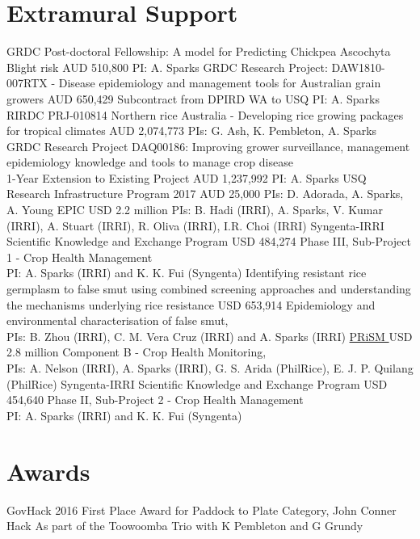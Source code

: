\section*{Extramural Support}
  \begin{entrylist}
			{GRDC Post-doctoral Fellowship: A model for Predicting Chickpea Ascochyta Blight risk}
			{AUD 510,800}
			{PI: A. Sparks}
			{GRDC Research Project: DAW1810-007RTX - Disease epidemiology and management tools for Australian grain growers}
			{AUD 650,429}
			{Subcontract from DPIRD WA to USQ PI: A. Sparks}
			{RIRDC PRJ-010814 Northern rice Australia - Developing rice growing packages for tropical climates}
			{AUD 2,074,773}
			{PIs: G. Ash, K. Pembleton, A. Sparks}
			{GRDC Research Project DAQ00186: Improving grower surveillance, management epidemiology knowledge and tools to manage crop disease\\1-Year Extension to Existing Project}
			{AUD 1,237,992}
			{PI: A. Sparks}
      {USQ Research Infrastructure Program 2017}
      {AUD 25,000}
      {PIs: D. Adorada, A. Sparks, A. Young}
      {EPIC }
      {USD 2.2 million}
      {PIs: B. Hadi (IRRI), A. Sparks, V. Kumar (IRRI), A. Stuart (IRRI), R. Oliva (IRRI), I.R. Choi (IRRI)}
	    {Syngenta-IRRI Scientific Knowledge and Exchange Program}
	    {USD 484,274}
	    {Phase III, Sub-Project 1 - Crop Health Management\\PI: A. Sparks (IRRI) and K. K. Fui (Syngenta)}
      {Identifying resistant rice germplasm to false smut using combined screening approaches and understanding the mechanisms underlying rice resistance}
      {USD 653,914}
      {Epidemiology and environmental characterisation of false smut,\\PIs: B. Zhou (IRRI), C. M. {Vera Cruz} (IRRI) and A. Sparks (IRRI)}
	    {\href{http://philippinericeinfo.ph/}{PRiSM }}
	    {USD 2.8 million}
	    {Component B - Crop Health Monitoring,\\PIs: A. Nelson (IRRI), A. Sparks (IRRI), G. S. Arida (PhilRice), E. J. P. Quilang (PhilRice)}
	    {Syngenta-IRRI Scientific Knowledge and Exchange Program}
	    {USD 454,640}
	    {Phase II, Sub-Project 2 - Crop Health Management\\PI: A. Sparks (IRRI) and K. K. Fui (Syngenta)}
\end{entrylist}

\section*{Awards}
  \begin{entrylist}
    {GovHack 2016 First Place Award for Paddock to Plate Category, John Conner Hack}
    {}
    {As part of the Toowoomba Trio with K Pembleton and G Grundy}
  \end{entrylist}
